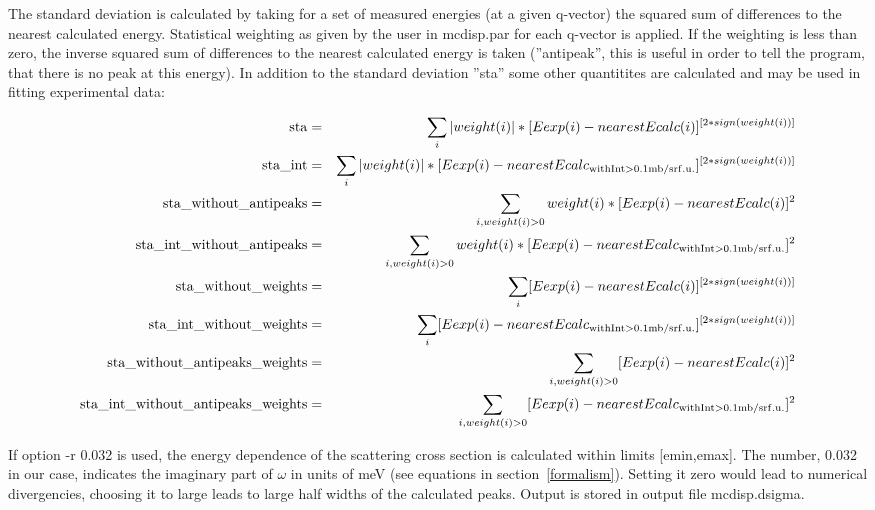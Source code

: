 The standard deviation is calculated by taking for a set of measured energies (at a 
given q-vector) the squared sum of differences to the nearest
calculated energy. Statistical weighting as given by the user in {\prg mcdisp.par}
for each q-vector is applied. If the weighting is less than zero, the 
inverse squared sum of differences to the nearest
calculated energy is taken (''antipeak'', this is useful in order to 
tell the program, that there is no peak at this energy).
In addition to the standard deviation ''sta'' some other quantitites are calculated and 
may be used in fitting experimental data:

\begin{eqnarray}
{\rm sta}                              & =& \sum_i |weight(i)|*[Eexp(i) - nearestEcalc(i)]^{[2*sign(weight(i))]}\\
{\rm sta\_int   }                       & = &\sum_i |weight(i)|*[Eexp(i) - nearestEcalc_{\rm with %
Int>0.1mb/srf.u.}]^{[2*sign(weight(i))]}\\
{\rm sta\_without\_antipeaks }           & =& \sum_{i, weight(i)>0}  weight(i)*[Eexp(i) - nearestEcalc(i)]^2\\
{\rm sta\_int\_without\_antipeaks }       & =&\sum_{i,weight(i)>0}  weight(i)*[Eexp(i) - nearestEcalc_{\rm with %
Int>0.1mb/srf.u.}]^2\\
{\rm sta\_without\_weights }              &=& \sum_i [Eexp(i) - nearestEcalc(i)]^{[2*sign(weight(i))]}\\
{\rm sta\_int\_without\_weights}          & =&\sum_i [Eexp(i) - nearestEcalc_{\rm with %
Int>0.1mb/srf.u.}]^{[2*sign(weight(i))]}\\
{\rm sta\_without\_antipeaks\_weights}    & = &\sum_{i, weight(i)>0}[Eexp(i) - nearestEcalc(i)]^2\\
{\rm sta\_int\_without\_antipeaks\_weights}& =& \sum_{i, weight(i)>0} [Eexp(i) - nearestEcalc_{\rm with %
Int>0.1mb/srf.u.}]^2\\
\end{eqnarray}



If option {\prg -r 0.032} is used, the energy dependence of 
the scattering cross section is calculated within limits [emin,emax].
The number, 0.032 in our case, indicates the imaginary part of $\omega$ 
in units of meV (see equations
in section~\ref{formalism}). Setting it zero would lead to numerical
divergencies, choosing it to large leads to large half widths of the calculated 
peaks. 
 Output
is stored in output file {\prg mcdisp.dsigma}.

